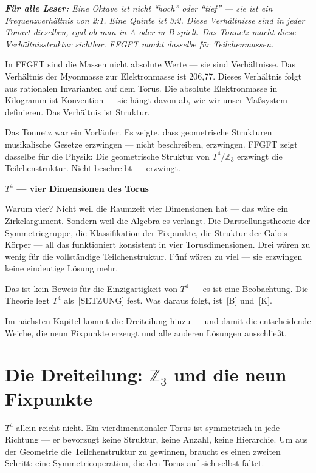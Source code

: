 \documentclass[11pt,oneside]{book}
\newcommand{\status}[1]{\penalty10000\,{\scriptsize\textcolor{gray!60}{[#1]}}}
\newenvironment{laierspur}{%
  \par\vspace{4pt}%
  \noindent\small\itshape\color{blue!60!black}%
  \textbf{Für alle Leser:}\enspace\ignorespaces}{%
  \par\vspace{4pt}\normalsize\normalfont\normalcolor}
\begin{document}
\begin{laierspur}
Eine Oktave ist nicht \enquote{hoch} oder \enquote{tief} — sie ist ein
Frequenzverhältnis von 2:1. Eine Quinte ist 3:2. Diese Verhältnisse
sind in jeder Tonart dieselben, egal ob man in A oder in B spielt.
Das Tonnetz macht diese Verhältnisstruktur sichtbar. FFGFT macht
dasselbe für Teilchenmassen.
\end{laierspur}

In FFGFT sind die Massen nicht absolute Werte — sie sind Verhältnisse. Das
Verhältnis der Myonmasse zur Elektronmasse ist 206,77. Dieses Verhältnis
folgt aus rationalen Invarianten auf dem Torus. Die absolute Elektronmasse
in Kilogramm ist Konvention — sie hängt davon ab, wie wir unser Maßsystem
definieren. Das Verhältnis ist Struktur.


Das Tonnetz war ein Vorläufer. Es zeigte, dass geometrische Strukturen
musikalische Gesetze erzwingen — nicht beschreiben, erzwingen. FFGFT zeigt
dasselbe für die Physik: Die geometrische Struktur von $T^4/\mathbb{Z}_3$ erzwingt die
Teilchenstruktur. Nicht beschreibt — erzwingt.


\textbf{$T^4$ — vier Dimensionen des Torus}


Warum vier? Nicht weil die Raumzeit vier Dimensionen hat — das wäre ein
Zirkelargument. Sondern weil die Algebra es verlangt. Die Darstellungstheorie
der Symmetriegruppe, die Klassifikation der Fixpunkte, die Struktur der
Galois-Körper — all das funktioniert konsistent in vier Torusdimensionen.
Drei wären zu wenig für die vollständige Teilchenstruktur. Fünf wären zu
viel — sie erzwingen keine eindeutige Lösung mehr.


Das ist kein Beweis für die Einzigartigkeit von $T^4$ — es ist eine Beobachtung.
Die Theorie legt $T^4$ als \status{SETZUNG} fest. Was daraus folgt, ist \status{B} und \status{K}.


Im nächsten Kapitel kommt die Dreiteilung hinzu — und damit die entscheidende
Weiche, die neun Fixpunkte erzeugt und alle anderen Lösungen ausschließt.








\chapter{\texorpdfstring{Die Dreiteilung: $\mathbb{Z}_3$ und die neun Fixpunkte}{Die Dreiteilung: Z3 und die neun Fixpunkte}}

$T^4$ allein reicht nicht. Ein vierdimensionaler Torus ist symmetrisch in jede
Richtung — er bevorzugt keine Struktur, keine Anzahl, keine Hierarchie. Um
aus der Geometrie die Teilchenstruktur zu gewinnen, braucht es einen zweiten
Schritt: eine Symmetrieoperation, die den Torus auf sich selbst faltet.
\end{document}
